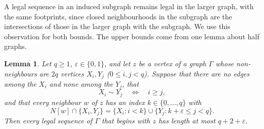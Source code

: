 \documentclass[11pt,a4paper,reqno]{amsart}
\newtheorem{lemma}[theorem]{Lemma}
\theoremstyle{definition}
\theoremstyle{remark}
\numberwithin{equation}{section}
\begin{document}
A legal sequence in an induced subgraph remains legal in the larger graph, with the same footprints, since closed neighbourhoods in the subgraph are the intersections of those in the larger graph with the subgraph. We use this observation for both bounds. The upper bounds come from one lemma about half graphs.

\begin{lemma}\label{lem:half}
Let $q\ge1$, $\varepsilon\in\{0,1\}$, and let $z$ be a vertex of a graph $\Gamma$ whose non-neighbours are $2q$ vertices $X_i,Y_j$ ($0\le i,j<q$). Suppose that there are no edges among the $X_i$ and none among the $Y_j$, that
\begin{equation}\label{eq:half}
 X_i\sim Y_j\quad\Longleftrightarrow\quad i\ge j,
\end{equation}
and that every neighbour $w$ of $z$ has an index $k\in\{0,\dots,q\}$ with
\begin{equation}\label{eq:wk}
 N[w]\cap\{X_i,Y_j\}=\{X_i:i<k\}\cup\{Y_j:k+\varepsilon\le j<q\}.
\end{equation}
Then every legal sequence of $\Gamma$ that begins with $z$ has length at most $q+2+\varepsilon$.
\end{lemma}
\end{document}
